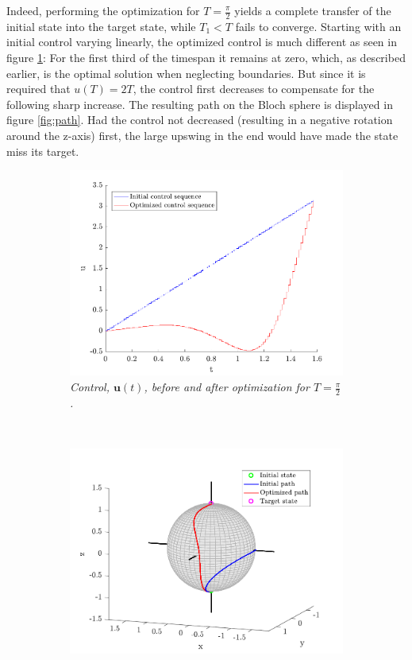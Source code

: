 Indeed, performing the optimization for $T = \frac{\pi}{2}$ yields a complete transfer of the initial state into the target state, while $T_1 < T$ fails to converge. Starting with an initial control varying linearly, the optimized control is much different as seen in figure \ref{fig:control}: For the first third of the timespan it remains at zero, which, as described earlier, is the optimal solution when neglecting boundaries. But since it is required that $u(T) = 2 T$, the control first decreases to compensate for the following sharp increase. The resulting path on the Bloch sphere is displayed in figure \ref{fig:path}. Had the control not decreased (resulting in a negative rotation around the z-axis) first, the large upswing in the end would have made the state miss its target.
\begin{figure}[h!]
    \centering
    \begin{subfigure}[t]{0.49\textwidth}
        \includegraphics[width=\textwidth]{Figures/control.pdf}
        \caption{\textit{Control, $\boldsymbol{u}(t)$, before and after optimization for $T = \frac{\pi}{2}$.}}
        \label{fig:control}
    \end{subfigure}
    ~
    \begin{subfigure}[t]{0.49\textwidth}
        \includegraphics[width=\textwidth]{Figures/path.pdf}

\end{subfigure}
\end{figure}
